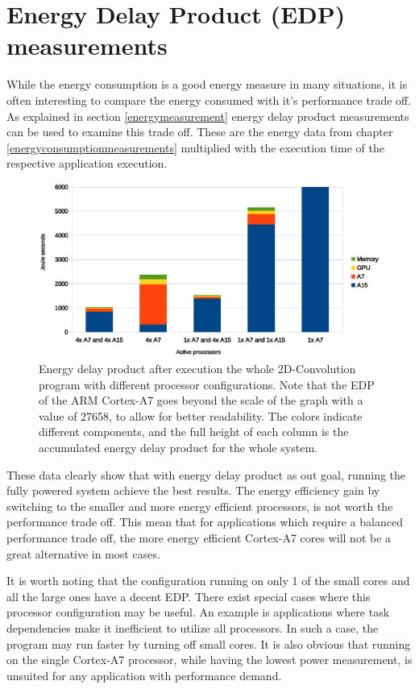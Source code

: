 \section{Energy Delay Product (EDP) measurements} \label{EDP}
While the energy consumption is a good energy measure in many situations, it is often interesting to compare the energy consumed with it's performance trade off.
As explained in section \ref{energymeasurement} energy delay product measurements can be used to examine this trade off.
These are the energy data from chapter \ref{energyconsumptionmeasurements} multiplied with the execution time of the respective application execution.

\begin{figure}[H]
  \centering
  \includegraphics[width=160mm]{fig/EDP-configurations.eps}
  \caption{Energy delay product after execution the whole 2D-Convolution program with different processor configurations. Note that the EDP of the ARM Cortex-A7 goes beyond the scale of the graph with a value of 27658, to allow for better readability. The colors indicate different components, and the full height of each column is the accumulated energy delay product for the whole system.\label{overflow}} \label {EDP-configurations}
\end{figure}

These data clearly show that with energy delay product as out goal, running the fully powered system achieve the best results.
The energy efficiency gain by switching to the smaller and more energy efficient processors, is not worth the performance trade off.
This mean that for applications which require a balanced performance trade off, the more energy efficient Cortex-A7 cores will not be a great alternative in most cases.

It is worth noting that the configuration running on only 1 of the small cores and all the large ones have a decent EDP.
There exist special cases where this processor configuration may be useful.
An example is applications where task dependencies make it inefficient to utilize all processors.
In such a case, the program may run faster by turning off small cores.
It is also obvious that running on the single Cortex-A7 processor, while having the lowest power measurement, is unsuited for any application with performance demand.

